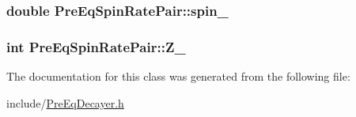 \hypertarget{classPreEqSpinRatePair_af88cd36daa52c5988fb000c0c67e49f9}{
\subsubsection[{spin\-\_\-}]{\setlength{\rightskip}{0pt plus 5cm}double Pre\-Eq\-Spin\-Rate\-Pair\-::spin\-\_\-}}\label{classPreEqSpinRatePair_af88cd36daa52c5988fb000c0c67e49f9}
\hypertarget{classPreEqSpinRatePair_afd6f7c07bd17e8fbdb7acabd763f2b92}{
\subsubsection[{Z\-\_\-}]{\setlength{\rightskip}{0pt plus 5cm}int Pre\-Eq\-Spin\-Rate\-Pair\-::\-Z\-\_\-}}\label{classPreEqSpinRatePair_afd6f7c07bd17e8fbdb7acabd763f2b92}


The documentation for this class was generated from the following file\-:\begin{DoxyCompactItemize}
\item 
include/\hyperlink{PreEqDecayer_8h}{Pre\-Eq\-Decayer.\-h}\end{DoxyCompactItemize}
